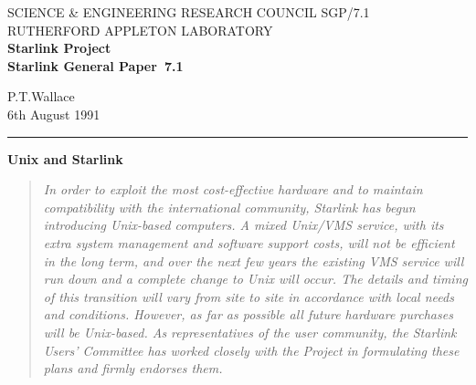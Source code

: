 \pagestyle{myheadings}

\newcommand{\stardoccategory}  {Starlink General Paper}
\newcommand{\stardocinitials}  {SGP}
\newcommand{\stardocnumber}    {7.1}
\newcommand{\stardocauthors}   {P.T.Wallace}
\newcommand{\stardocdate}      {6th August 1991}
\newcommand{\stardoctitle}     {Unix and Starlink}

\newcommand{\stardocname}{\stardocinitials /\stardocnumber}
\renewcommand{\_}{{\tt\char'137}}     %
\markright{\stardocname}
\setlength{\textwidth}{160mm}
\setlength{\textheight}{240mm}
\setlength{\topmargin}{-5mm}
\setlength{\oddsidemargin}{0mm}
\setlength{\evensidemargin}{0mm}
\setlength{\parindent}{0mm}
\setlength{\parskip}{\medskipamount}
\setlength{\unitlength}{1mm}


\thispagestyle{empty}
SCIENCE \& ENGINEERING RESEARCH COUNCIL \hfill \stardocname\\
RUTHERFORD APPLETON LABORATORY\\
{\large\bf Starlink Project\\}
{\large\bf \stardoccategory\ \stardocnumber}
\begin{flushright}
\stardocauthors\\
\stardocdate
\end{flushright}
\vspace{-4mm}
\rule{\textwidth}{0.5mm}
\vspace{4mm}
\begin{center}
{\Large\bf \stardoctitle}
\end{center}
\vspace{1mm}
\begin{quote}
{\it In order to exploit the most cost-effective hardware and to
maintain compatibility with the international community, Starlink has
begun introducing Unix-based computers.  A mixed Unix/VMS service, with
its extra system management and software support costs, will not be
efficient in the long term, and over the next few years the existing
VMS service will run down and a complete change to Unix will occur.
The details and timing of this transition will vary from site to site in
accordance with local needs and conditions.  However, as far as possible
all future hardware purchases will be Unix-based.  As representatives of
the user community, the Starlink Users' Committee has worked closely
with the Project in formulating these plans and firmly endorses them.}
\end{quote}

